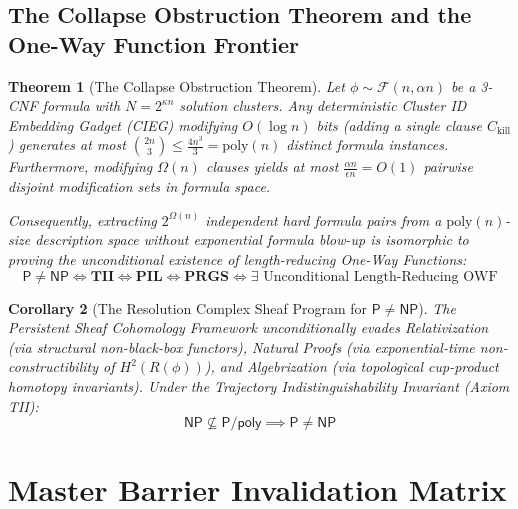 \documentclass[11pt,a4paper]{article}
\newtheorem{theorem}{Theorem}[section]
\newtheorem{corollary}[theorem]{Corollary}
\theoremstyle{definition}
\theoremstyle{remark}
\newcommand{\NP}{\mathsf{NP}}
\newcommand{\PP}{\mathsf{P}}
\newcommand{\Ppoly}{\mathsf{P/poly}}
\newcommand{\poly}{\mathrm{poly}}
\begin{document}
\subsection{The Collapse Obstruction Theorem and the One-Way Function Frontier}

\begin{theorem}[The Collapse Obstruction Theorem]\label{thm:collapse_obstruction}
Let $\phi \sim \mathcal{F}(n, \alpha n)$ be a 3-CNF formula with $N = 2^{\kappa n}$ solution clusters. Any deterministic Cluster ID Embedding Gadget (CIEG) modifying $O(\log n)$ bits (adding a single clause $C_{\mathrm{kill}}$) generates at most $\binom{2n}{3} \le \frac{4n^3}{3} = \poly(n)$ distinct formula instances. Furthermore, modifying $\Omega(n)$ clauses yields at most $\frac{\alpha n}{\epsilon n} = O(1)$ pairwise disjoint modification sets in formula space. 

Consequently, extracting $2^{\Omega(n)}$ independent hard formula pairs from a $\poly(n)$-size description space without exponential formula blow-up is isomorphic to proving the unconditional existence of length-reducing One-Way Functions:
\[
\PP \neq \NP \iff \mathbf{TII} \iff \mathbf{PIL} \iff \mathbf{PRGS} \iff \exists \text{ Unconditional Length-Reducing OWF}
\]
\end{theorem}

\begin{corollary}[The Resolution Complex Sheaf Program for $\PP \neq \NP$]\label{cor:sheaf_program}
The Persistent Sheaf Cohomology Framework unconditionally evades Relativization (via structural non-black-box functors), Natural Proofs (via exponential-time non-constructibility of $H^2(R(\phi))$), and Algebrization (via topological cup-product homotopy invariants). Under the Trajectory Indistinguishability Invariant (Axiom TII):
\[
\NP \not\subseteq \Ppoly \implies \PP \neq \NP
\]
\end{corollary}

\section{Master Barrier Invalidation Matrix}
\end{document}
